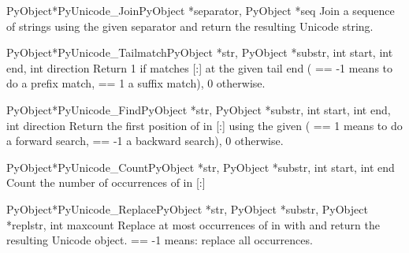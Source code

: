 \documentclass{manual}
\begin{document}
\begin{cfuncdesc}{PyObject*}{PyUnicode_Join}{PyObject *separator,
                                             PyObject *seq}
Join a sequence of strings using the given separator and return
the resulting Unicode string.
\end{cfuncdesc}

\begin{cfuncdesc}{PyObject*}{PyUnicode_Tailmatch}{PyObject *str,
                                                  PyObject *substr,
                                                  int start,
                                                  int end,
                                                  int direction}
Return 1 if  matches [:] at
the given tail end ( == -1 means to do a prefix match,
 == 1 a suffix match), 0 otherwise.
\end{cfuncdesc}

\begin{cfuncdesc}{PyObject*}{PyUnicode_Find}{PyObject *str,
                                                  PyObject *substr,
                                                  int start,
                                                  int end,
                                                  int direction}
Return the first position of  in
[:] using the given 
( == 1 means to do a forward search,
 == -1 a backward search), 0 otherwise.
\end{cfuncdesc}

\begin{cfuncdesc}{PyObject*}{PyUnicode_Count}{PyObject *str,
                                                  PyObject *substr,
                                                  int start,
                                                  int end}
Count the number of occurrences of  in
[:]
\end{cfuncdesc}

\begin{cfuncdesc}{PyObject*}{PyUnicode_Replace}{PyObject *str,
                                                PyObject *substr,
                                                PyObject *replstr,
                                                int maxcount}
Replace at most  occurrences of  in
 with  and return the resulting Unicode object.
 == -1 means: replace all occurrences.
\end{cfuncdesc}
\end{document}
